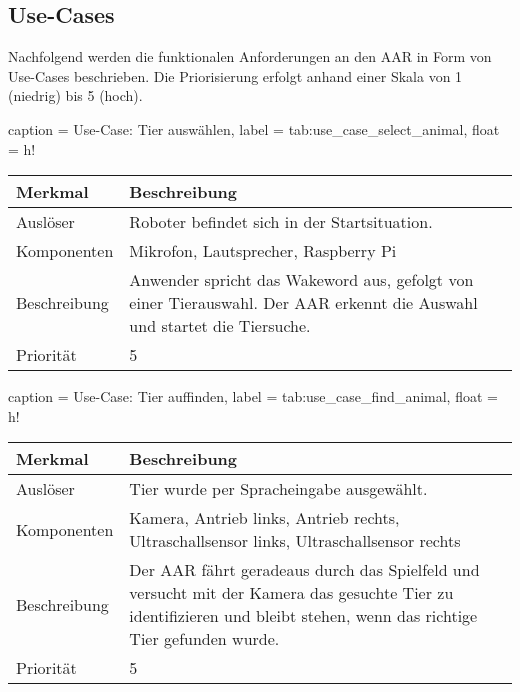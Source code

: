 \subsection{Use-Cases}\label{sec:use_cases}

Nachfolgend werden die funktionalen Anforderungen an den \ac{AAR} in Form von Use-Cases beschrieben.
Die Priorisierung erfolgt anhand einer Skala von 1 (niedrig) bis 5 (hoch).

\begin{dhbwtable}{%
    caption	= Use-Case: Tier auswählen,
    label	= tab:use_case_select_animal,
    float   = h!
}
    \begin{tabularx}{\textwidth}{lX}
        \toprule
        \textbf{Merkmal}     & \textbf{Beschreibung}  \\\midrule
        Auslöser     & Roboter befindet sich in der Startsituation.\\
        Komponenten  & Mikrofon, Lautsprecher, Raspberry Pi\\
        Beschreibung & Anwender spricht das Wakeword aus, gefolgt von einer Tierauswahl. Der \ac{AAR} erkennt die Auswahl und startet die Tiersuche.\\
        Priorität    & 5 \\\bottomrule
    \end{tabularx}    
\end{dhbwtable}

\begin{dhbwtable}{%
    caption	= Use-Case: Tier auffinden,
    label	= tab:use_case_find_animal,
    float   = h!
}
    \begin{tabularx}{\textwidth}{lX}
        \toprule
        \textbf{Merkmal}     & \textbf{Beschreibung}  \\\midrule
        Auslöser     & Tier wurde per Spracheingabe ausgewählt.\\
        Komponenten  & Kamera, Antrieb links, Antrieb rechts, Ultraschallsensor links, Ultraschallsensor rechts\\
        Beschreibung & Der \ac{AAR} fährt geradeaus durch das Spielfeld und versucht mit der Kamera das gesuchte Tier zu identifizieren und bleibt stehen, wenn das richtige Tier gefunden wurde.\\
        Priorität    & 5 \\\bottomrule
    \end{tabularx}    
\end{dhbwtable}

